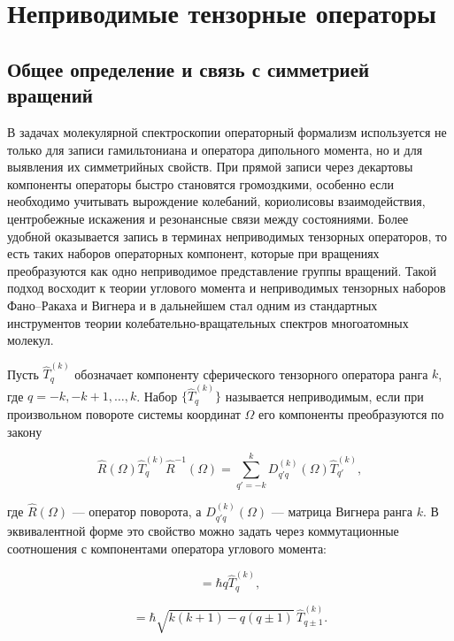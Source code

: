 \section{Неприводимые тензорные операторы}\label{sec:methods/ito}

\subsection{Общее определение и связь с симметрией вращений}

В задачах молекулярной спектроскопии операторный формализм используется не
только для записи гамильтониана и оператора дипольного момента, но и для
выявления их симметрийных свойств. При прямой записи через декартовы
компоненты операторы быстро становятся громоздкими, особенно если необходимо
учитывать вырождение колебаний, кориолисовы взаимодействия, центробежные
искажения и резонансные связи между состояниями. Более удобной оказывается
запись в терминах неприводимых тензорных операторов, то есть таких наборов
операторных компонент, которые при вращениях преобразуются как одно
неприводимое представление группы вращений. Такой подход восходит к теории
углового момента и неприводимых тензорных наборов Фано--Ракаха и Вигнера
\cite{Fano1959,Wigner1965,Varshalovich1988} и в дальнейшем стал одним из
стандартных инструментов теории колебательно-вращательных спектров
многоатомных молекул.

Пусть $\hat{T}^{(k)}_q$ обозначает компоненту сферического тензорного
оператора ранга $k$, где $q=-k,-k+1,\ldots,k$. Набор
$\{\hat{T}^{(k)}_q\}$ называется неприводимым, если при произвольном
повороте системы координат $\Omega$ его компоненты преобразуются по закону

\begin{equation}
\hat{R}(\Omega)\hat{T}^{(k)}_q\hat{R}^{-1}(\Omega)=
\sum_{q'=-k}^{k}D^{(k)}_{q'q}(\Omega)\hat{T}^{(k)}_{q'},
\end{equation}

где $\hat{R}(\Omega)$ --- оператор поворота, а $D^{(k)}_{q'q}(\Omega)$ ---
матрица Вигнера ранга $k$. В эквивалентной форме это свойство можно задать
через коммутационные соотношения с компонентами оператора углового момента:

\begin{equation}
[\hat{J}_z,\hat{T}^{(k)}_q]=\hbar q\hat{T}^{(k)}_q,
\end{equation}

\begin{equation}
[\hat{J}_{\pm},\hat{T}^{(k)}_q]=
\hbar\sqrt{k(k+1)-q(q\pm1)}\,\hat{T}^{(k)}_{q\pm1}.
\end{equation}

